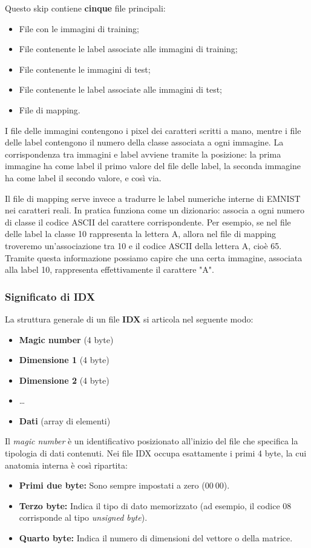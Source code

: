 \documentclass[12pt,a4paper]{article}
\begin{document}
	Questo skip contiene \textbf{cinque} file principali:
	\begin{itemize}
		\item File con le immagini di training;
		\item File contenente le label associate alle immagini di training;
		\item File contenente le immagini di test;
		\item File contenente le label associate alle immagini di test;
		\item File di mapping.
	\end{itemize}

	I file delle immagini contengono i pixel dei caratteri scritti a mano, mentre i file delle label contengono il numero della classe associata a ogni immagine. \newline
	La corrispondenza tra immagini e label avviene tramite la posizione: la prima immagine ha come label il primo valore del file delle label, la seconda immagine ha come label il secondo valore, e così via.
	\medskip

	Il file di mapping serve invece a tradurre le label numeriche interne di EMNIST nei caratteri reali. \newline In pratica funziona come un dizionario: associa a ogni numero di classe il codice ASCII del carattere corrispondente. Per esempio, se nel file delle label la classe 10 rappresenta la lettera A, allora nel file di mapping troveremo un’associazione tra 10 e il codice ASCII della lettera A, cioè 65. Tramite questa informazione possiamo capire che una certa immagine, associata alla label 10, rappresenta effettivamente il carattere "A".

	\subsubsection{Significato di IDX}
	La struttura generale di un file \textbf{IDX} si articola nel seguente modo:
	\begin{itemize}
		\item \textbf{Magic number} (4 byte)
		\item \textbf{Dimensione 1} (4 byte)
		\item \textbf{Dimensione 2} (4 byte)
		\item \dots
		\item \textbf{Dati} (array di elementi)
	\end{itemize}

	Il \textit{magic number} è un identificativo posizionato all'inizio del file che specifica la tipologia di dati contenuti. Nei file IDX occupa esattamente i primi 4 byte, la cui anatomia interna è così ripartita:
	\begin{itemize}
		\item \textbf{Primi due byte:} Sono sempre impostati a zero ($00\ 00$).
		\item \textbf{Terzo byte:} Indica il tipo di dato memorizzato (ad esempio, il codice $08$ corrisponde al tipo \textit{unsigned byte}).
		\item \textbf{Quarto byte:} Indica il numero di dimensioni del vettore o della matrice.
	\end{itemize}
\end{document}
